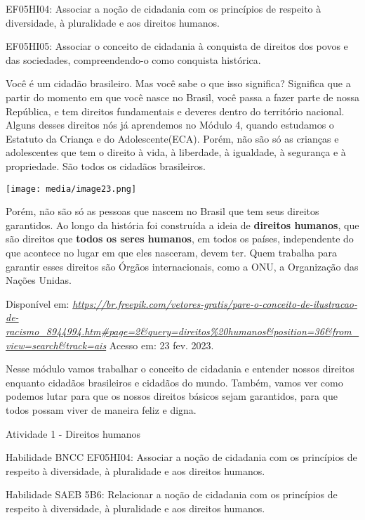 EF05HI04: Associar a noção de cidadania com os princípios de respeito à
diversidade, à pluralidade e aos direitos humanos.

EF05HI05: Associar o conceito de cidadania à conquista de direitos dos
povos e das sociedades, compreendendo-o como conquista histórica.

Você é um cidadão brasileiro. Mas você sabe o que isso significa?
Significa que a partir do momento em que você nasce no Brasil, você
passa a fazer parte de nossa República, e tem direitos fundamentais e
deveres dentro do território nacional. Alguns desses direitos nós já
aprendemos no Módulo 4, quando estudamos o Estatuto da Criança e do
Adolescente(ECA). Porém, não são só as crianças e adolescentes que tem o
direito à vida, à liberdade, à igualdade, à segurança e à propriedade.
São todos os cidadãos brasileiros.

\texttt{[image: media/image23.png]}

Porém, não são só as pessoas que nascem no Brasil que tem seus direitos
garantidos. Ao longo da história foi construída a ideia de
\textbf{direitos humanos}, que são direitos que \textbf{todos os seres
humanos}, em todos os países, independente do que acontece no lugar em
que eles nasceram, devem ter. Quem trabalha para garantir esses direitos
são Órgãos internacionais, como a ONU, a Organização das Nações Unidas.

Disponível em:
\href{https://br.freepik.com/vetores-gratis/pare-o-conceito-de-ilustracao-de-racismo_8944994.htm\#page=2\&query=direitos\%20humanos\&position=36\&from_view=search\&track=ais}{\emph{https://br.freepik.com/vetores-gratis/pare-o-conceito-de-ilustracao-de-racismo\_8944994.htm\#page=2\&query=direitos\%20humanos\&position=36\&from\_view=search\&track=ais}}
Acesso em: 23 fev. 2023.

Nesse módulo vamos trabalhar o conceito de cidadania e entender nossos
direitos enquanto cidadãos brasileiros e cidadãos do mundo. Também,
vamos ver como podemos lutar para que os nossos direitos básicos sejam
garantidos, para que todos possam viver de maneira feliz e digna.

Atividade 1 - Direitos humanos

Habilidade BNCC EF05HI04: Associar a noção de cidadania com os
princípios de respeito à diversidade, à pluralidade e aos direitos
humanos.

Habilidade SAEB 5B6: Relacionar a noção de cidadania com os princípios
de respeito à diversidade, à pluralidade e aos direitos humanos.

